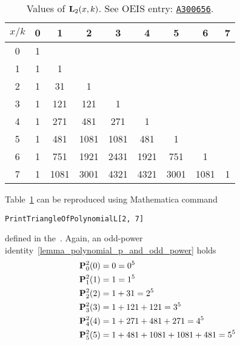\begin{table}[H]
    \begin{tabular}{c|cccccccc}
        $x/k$ & 0 & 1    & 2    & 3    & 4    & 5    & 6    & 7 \\ [3px]
        \hline
        0     & 1 &      &      &      &      &      &      &   \\
        1     & 1 & 1    &      &      &      &      &      &   \\
        2     & 1 & 31   & 1    &      &      &      &      &   \\
        3     & 1 & 121  & 121  & 1    &      &      &      &   \\
        4     & 1 & 271  & 481  & 271  & 1    &      &      &   \\
        5     & 1 & 481  & 1081 & 1081 & 481  & 1    &      &   \\
        6     & 1 & 751  & 1921 & 2431 & 1921 & 751  & 1    &   \\
        7     & 1 & 1081 & 3001 & 4321 & 4321 & 3001 & 1081 & 1
    \end{tabular}
    \caption{Values of ${\mathbf{L}}\sb{2}(x,k)$. See OEIS entry: \href{https://oeis.org/A300656}{\texttt{A300656}}.}
    \label{tab:tab_4}
\end{table}
Table~\ref{tab:tab_4} can be reproduced using Mathematica command
\begin{center}
    \texttt{PrintTriangleOfPolynomialL[2, 7]}
\end{center}
defined in the~\cite{PK22Source}.
Again, an odd-power identity~\ref{lemma_polynomial_p_and_odd_power} holds
\begin{equation*}
    \begin{split}
        {\mathbf{P}}\sp{2} \sb{0}(0) &= 0 = 0^5 \\
        {\mathbf{P}}\sp{2} \sb{1}(1) &= 1 = 1^5 \\
        {\mathbf{P}}\sp{2} \sb{2}(2) &= 1+31 = 2^5 \\
        {\mathbf{P}}\sp{2} \sb{3}(3) &= 1+121+121 = 3^5 \\
        {\mathbf{P}}\sp{2} \sb{4}(4) &= 1+271+481+271 = 4^5 \\
        {\mathbf{P}}\sp{2} \sb{5}(5) &= 1+481+1081+1081+481 = 5^5
    \end{split}
\end{equation*}
